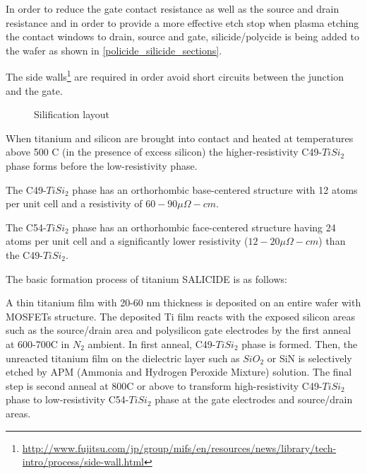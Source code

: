 In order to reduce the gate contact resistance as well as the source and drain resistance and in order to provide a more effective etch stop when plasma etching the contact windows to drain, source and gate, silicide/polycide is being added to the wafer as shown in \autoref{policide_silicide_sections}.

The side walls\footnote{\url{http://www.fujitsu.com/jp/group/mifs/en/resources/news/library/tech-intro/process/side-wall.html}} are required in order avoid short circuits between the junction and the gate.

\begin{figure}[H]
	\centering
	\begin{tikzpicture}[node distance =1cm, auto, thick,scale=\VLSILayout, every node/.style={transform shape}]
		
	\end{tikzpicture}
	\caption{Silification layout}
	\label{silicification_layout}
\end{figure}

When titanium and silicon are brought into contact and heated at temperatures above 500 \degree C (in the presence of excess silicon) the higher-resistivity C49-$TiSi_2$ phase forms before the low-resistivity phase.

The C49-$TiSi_2$ phase has an orthorhombic base-centered structure with 12 atoms per unit cell and a resistivity of $60-90 \mu\Omega - cm$.

The C54-$TiSi_2$ phase has an orthorhombic face-centered structure having 24 atoms per unit cell and a significantly lower resistivity ($12-20 \mu\Omega - cm$) than the C49-$TiSi_2$.

The basic formation process of titanium SALICIDE is as follows:

A thin titanium film with 20-60 nm thickness is deposited on an entire wafer with MOSFETs structure.
The deposited Ti film reacts with the exposed silicon areas such as the source/drain area and polysilicon gate electrodes by the first anneal at 600-700\degree C in $N_2$ ambient. In first anneal, C49-$TiSi_2$ phase is formed.
Then, the unreacted titanium film on the dielectric layer such as $SiO_2$ or SiN is selectively etched by APM (Ammonia and Hydrogen Peroxide Mixture) solution.
The final step is second anneal at 800\degree C or above to transform high-resistivity C49-$TiSi_2$ phase to low-resistivity C54-$TiSi_2$ phase at the gate electrodes and source/drain areas.

\newpage

